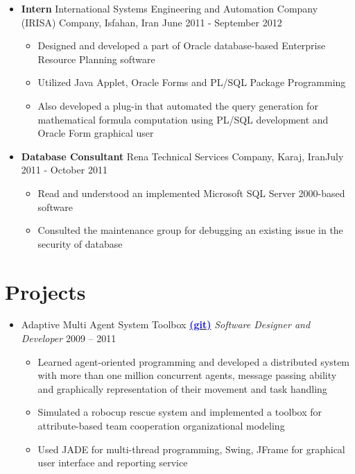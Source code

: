 \documentclass[letter]{res}
\begin{document}
\begin{resume}
\begin{itemize}[leftmargin=-.1in]
			\item \textbf{Intern} \newline
			International Systems Engineering and Automation Company (IRISA) Company, Isfahan, Iran \hfill June 2011 - September 2012\\
			\vspace{-4mm}
			\iflong
			\begin{itemize}
				\item Designed and developed a part of Oracle database-based Enterprise Resource Planning software
				\item Utilized Java Applet, Oracle Forms and PL/SQL Package Programming
				\item Also developed a plug-in that automated the query generation for mathematical formula computation using PL/SQL development and Oracle Form graphical user
			\end{itemize}
			\fi
			
			\item \textbf{Database Consultant}
			\newline
			Rena Technical Services Company, Karaj, Iran\hfill July 2011 - October 2011\\
			\vspace{-4mm}
			\iflong
			\begin{itemize}
				\item Read and understood an implemented Microsoft SQL Server 2000-based software
				\item Consulted the maintenance group for debugging an existing issue in the security of database
			\end{itemize}
		\end{itemize}
		
		
		\section{Projects}
		\begin{itemize}[leftmargin=-.1in]
			\item Adaptive Multi Agent System Toolbox {\href{https://github.com/omid55/team_based_rescue_jade_multi_agent_system}{\textbf{\textcolor{blue}{(git)}}}} \newline
			{\sl Software Designer and Developer} \hfill 2009 – 2011\\
			\vspace{-4mm}
			\iflong
			\begin{itemize}
				\item Learned agent-oriented programming and developed a distributed system with more than one million concurrent agents, message passing ability and graphically representation of their movement and task handling
				\item Simulated a robocup rescue system and implemented a toolbox for 				attribute-based team cooperation organizational modeling
				\item Used JADE for multi-thread programming, Swing, JFrame for graphical user interface and reporting service
			\end{itemize}
			\fi
			

\end{itemize}
\end{resume}
\end{document}
